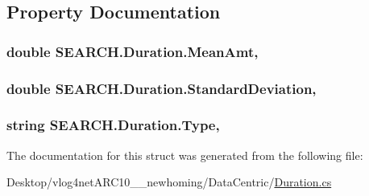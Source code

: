 \subsection{Property Documentation}
\hypertarget{struct_s_e_a_r_c_h_1_1_duration_aa3efd8fee940b36f5286f814bbce9f97}{
\subsubsection[{Mean\-Amt}]{\setlength{\rightskip}{0pt plus 5cm}double S\-E\-A\-R\-C\-H.\-Duration.\-Mean\-Amt\hspace{0.3cm}{\ttfamily [get]}, {\ttfamily [set]}}}\label{struct_s_e_a_r_c_h_1_1_duration_aa3efd8fee940b36f5286f814bbce9f97}
\hypertarget{struct_s_e_a_r_c_h_1_1_duration_abd2fd1478a37e9f17c39062878d1805e}{
\subsubsection[{Standard\-Deviation}]{\setlength{\rightskip}{0pt plus 5cm}double S\-E\-A\-R\-C\-H.\-Duration.\-Standard\-Deviation\hspace{0.3cm}{\ttfamily [get]}, {\ttfamily [set]}}}\label{struct_s_e_a_r_c_h_1_1_duration_abd2fd1478a37e9f17c39062878d1805e}
\hypertarget{struct_s_e_a_r_c_h_1_1_duration_ab51c7298f0c8181cd0f22d965090ca5a}{
\subsubsection[{Type}]{\setlength{\rightskip}{0pt plus 5cm}string S\-E\-A\-R\-C\-H.\-Duration.\-Type\hspace{0.3cm}{\ttfamily [get]}, {\ttfamily [set]}}}\label{struct_s_e_a_r_c_h_1_1_duration_ab51c7298f0c8181cd0f22d965090ca5a}


The documentation for this struct was generated from the following file\-:\begin{DoxyCompactItemize}
\item 
Desktop/vlog4net\-A\-R\-C10\-\_\-\_\-newhoming/\-Data\-Centric/\hyperlink{_duration_8cs}{Duration.\-cs}\end{DoxyCompactItemize}
